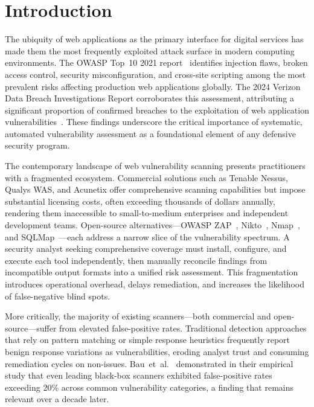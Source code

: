 \documentclass[conference]{IEEEtran}
\begin{document}
\section{Introduction}

The ubiquity of web applications as the primary interface for digital services has made them the most frequently exploited attack surface in modern computing environments. The OWASP Top~10 2021 report~\cite{owasp2021top10} identifies injection flaws, broken access control, security misconfiguration, and cross-site scripting among the most prevalent risks affecting production web applications globally. The 2024 Verizon Data Breach Investigations Report corroborates this assessment, attributing a significant proportion of confirmed breaches to the exploitation of web application vulnerabilities~\cite{nist800115}. These findings underscore the critical importance of systematic, automated vulnerability assessment as a foundational element of any defensive security program.

The contemporary landscape of web vulnerability scanning presents practitioners with a fragmented ecosystem. Commercial solutions such as Tenable Nessus, Qualys WAS, and Acunetix offer comprehensive scanning capabilities but impose substantial licensing costs, often exceeding thousands of dollars annually, rendering them inaccessible to small-to-medium enterprises and independent development teams. Open-source alternatives---OWASP ZAP~\cite{zap2015}, Nikto~\cite{nikto2001}, Nmap~\cite{nmappaper}, and SQLMap~\cite{sqlmap2009}---each address a narrow slice of the vulnerability spectrum. A security analyst seeking comprehensive coverage must install, configure, and execute each tool independently, then manually reconcile findings from incompatible output formats into a unified risk assessment. This fragmentation introduces operational overhead, delays remediation, and increases the likelihood of false-negative blind spots.

More critically, the majority of existing scanners---both commercial and open-source---suffer from elevated false-positive rates. Traditional detection approaches that rely on pattern matching or simple response heuristics frequently report benign response variations as vulnerabilities, eroding analyst trust and consuming remediation cycles on non-issues. Bau~et~al.~\cite{bau2010state} demonstrated in their empirical study that even leading black-box scanners exhibited false-positive rates exceeding 20\% across common vulnerability categories, a finding that remains relevant over a decade later.
\end{document}
